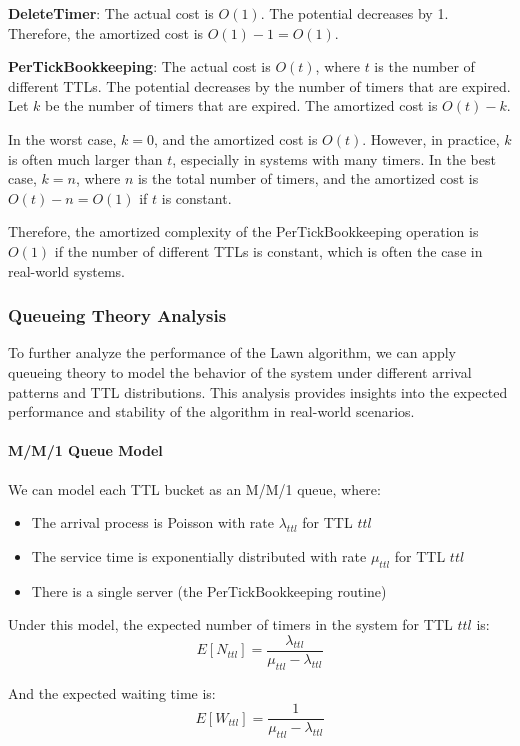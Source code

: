 \documentclass[conference]{IEEEtran}
\begin{document}
\textbf{DeleteTimer}: The actual cost is $O(1)$. The potential decreases by 1. Therefore, the amortized cost is $O(1) - 1 = O(1)$.

\textbf{PerTickBookkeeping}: The actual cost is $O(t)$, where $t$ is the number of different TTLs. The potential decreases by the number of timers that are expired. Let $k$ be the number of timers that are expired. The amortized cost is $O(t) - k$.

In the worst case, $k = 0$, and the amortized cost is $O(t)$. However, in practice, $k$ is often much larger than $t$, especially in systems with many timers. In the best case, $k = n$, where $n$ is the total number of timers, and the amortized cost is $O(t) - n = O(1)$ if $t$ is constant.

Therefore, the amortized complexity of the PerTickBookkeeping operation is $O(1)$ if the number of different TTLs is constant, which is often the case in real-world systems.

\subsubsection{Queueing Theory Analysis}
To further analyze the performance of the Lawn algorithm, we can apply queueing theory to model the behavior of the system under different arrival patterns and TTL distributions. This analysis provides insights into the expected performance and stability of the algorithm in real-world scenarios.

\paragraph{M/M/1 Queue Model}
We can model each TTL bucket as an M/M/1 queue, where:
\begin{itemize}
    \item The arrival process is Poisson with rate $\lambda_{ttl}$ for TTL $ttl$
    \item The service time is exponentially distributed with rate $\mu_{ttl}$ for TTL $ttl$
    \item There is a single server (the PerTickBookkeeping routine)
\end{itemize}

Under this model, the expected number of timers in the system for TTL $ttl$ is:
\begin{equation}
E[N_{ttl}] = \frac{\lambda_{ttl}}{\mu_{ttl} - \lambda_{ttl}}
\end{equation}

And the expected waiting time is:
\begin{equation}
E[W_{ttl}] = \frac{1}{\mu_{ttl} - \lambda_{ttl}}
\end{equation}
\end{document}
